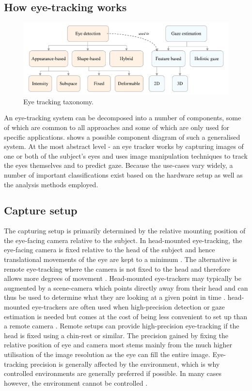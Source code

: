 \subsection{How eye-tracking works}
\begin{figure}
	\includegraphics[width=1\textwidth]{figures/model/taxonomy}
	\caption{Eye tracking taxonomy.}\label{fig:taxonomy}
\end{figure}
An eye-tracking system can be decomposed into a number of components, some of which are common to all approaches and some of which are only used for specific applications.  shows a possible component diagram of such a generalised system. At the most abstract level - an eye tracker works by capturing images of one or both of the subject's eyes and uses image manipulation techniques to track the eyes themselves and to predict gaze. Because the use-cases vary widely, a number of important classifications exist based on the hardware setup as well as the analysis methods employed.

\subsection{Capture setup}
The capturing setup is primarily determined by the relative mounting position of the eye-facing camera relative to the subject. In \gls{head-mounted} \gls{eye-tracking}, the eye-facing camera is fixed relative to the head of the subject and hence translational movements of the eye are kept to a minimum \parencite{hansen2009eye}. The alternative is remote \gls{eye-tracking} where the camera is not fixed to the head and therefore allows more degrees of movement \parencite{hansen2009eye}. Head-mounted eye-trackers may typically be augmented by a \gls{scene-camera} which points directly away from their head and can thus be used to determine what they are looking at a given point in time \parencite{hansen2009eye}. \Gls{head-mounted} \gls{eye-tracker}s are often used when high-precision detection or gaze estimation is needed but comes at the cost of being less convenient to set up than a remote camera \parencite{hansen2009eye}. Remote setups can provide high-precision eye-tracking if the head is fixed using a chin-rest or similar. The precision gained by fixing the relative position of eye and camera most stems mainly from the much higher utilisation of the image resolution as the eye can fill the entire image. Eye-tracking precision is generally affected by the environment, which is why controlled environments are generally preferred if possible. In many cases however, the environment cannot be controlled \parencite{hansen2009eye}.

